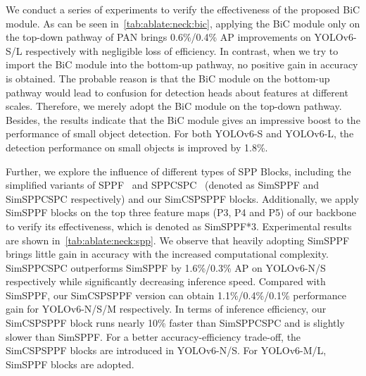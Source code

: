 \documentclass[10pt,twocolumn,letterpaper]{article}
\begin{document}
  We conduct a series of experiments to verify the effectiveness of the proposed BiC module. As can be seen in~\cref{tab:ablate:neck:bic}, applying the BiC module only on the top-down pathway of PAN brings 0.6\%/0.4\% AP improvements on YOLOv6-S/L respectively with negligible loss of efficiency. In contrast, when we try to import the BiC module into the bottom-up pathway, no positive gain in accuracy is obtained. The probable reason is that the BiC module on the bottom-up pathway would lead to confusion for detection heads about features at different scales. Therefore, we merely adopt the BiC module on the top-down pathway. Besides, the results indicate that the BiC module gives an impressive boost to the performance of small object detection. For both YOLOv6-S and YOLOv6-L, the detection performance on small objects is improved by 1.8\%.

  Further, we explore the influence of different types of SPP Blocks, including the simplified variants of SPPF~\cite{yolov5} and SPPCSPC~\cite{wang2022yolov7} (denoted as SimSPPF and SimSPPCSPC respectively) and our SimCSPSPPF blocks. Additionally, we apply SimSPPF blocks on the top three feature maps (P3, P4 and P5) of our backbone to verify its effectiveness, which is denoted as SimSPPF*3. Experimental results are shown in~\cref{tab:ablate:neck:spp}. We observe that heavily adopting SimSPPF brings little gain in accuracy with the increased computational complexity. SimSPPCSPC outperforms SimSPPF by 1.6\%/0.3\% AP on YOLOv6-N/S respectively while significantly decreasing inference speed. Compared with SimSPPF, our SimCSPSPPF version can obtain 1.1\%/0.4\%/0.1\% performance gain for YOLOv6-N/S/M respectively. In terms of inference efficiency, our SimCSPSPPF block runs nearly 10\% faster than SimSPPCSPC and is slightly slower than SimSPPF. For a better accuracy-efficiency trade-off, the SimCSPSPPF blocks are introduced in YOLOv6-N/S. For YOLOv6-M/L, SimSPPF blocks are adopted.
\end{document}
